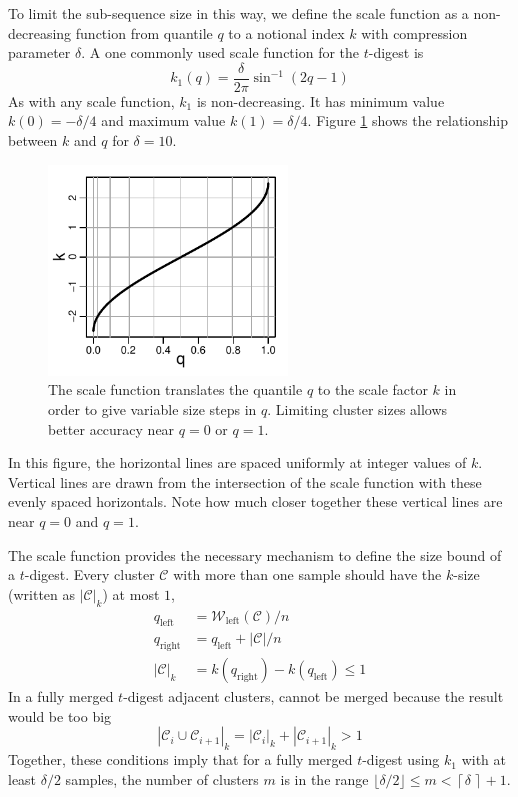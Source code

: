 \documentclass[11pt]{amsart}
\begin{document}
To limit the sub-sequence size in this way, we define the scale function as a non-decreasing function from quantile $q$ to a notional index $k$ with compression parameter $\delta$. A one commonly used  scale function for the $t$-digest is 
\[
k_1(q) = \frac \delta {2\pi}  { {\sin^{-1} (2q-1)} }    
\]
As with any scale function, $k_1$ is non-decreasing. It has minimum value  $k(0)=-\delta/4$ and maximum value  $k(1)=\delta/4$.  Figure \ref{fig:k-q-plot} shows the relationship between $k$ and $q$ for $\delta=10$. 
\begin{figure}[htbp] %
   \centering
   \includegraphics[width=2.5in]{k-q-plot.pdf} 
   \caption{The scale function translates the quantile $q$ to the scale factor $k$ in order to give variable size steps in $q$. Limiting cluster sizes allows better accuracy near $q=0$ or $q=1$. }
   \label{fig:k-q-plot}
\end{figure}
In this figure, the horizontal lines are spaced uniformly at integer values of $k$. Vertical lines are drawn from the intersection of the scale function with these evenly spaced horizontals. Note how much closer together these vertical lines are near $q=0$ and $q=1$.

The scale function provides the necessary mechanism to define the size bound of a $t$-digest. Every cluster $\mathcal C$ with more than one sample should have the $k$-size (written as $|\mathcal C|_k$) at most $1$,
\begin{align*}
q_{\mathrm {left}} &= {\mathcal W}_{\mathrm{left}}(\mathcal C)/n \\
q_{\mathrm {right}} &= q_{\mathrm {left}} + {| \mathcal C | / n}  \\
|\mathcal C|_k &= k \left (q_{\mathrm {right}} \right) - k \left ( q_{\mathrm {left}} \right) \le 1
\end{align*}
In a fully merged $t$-digest adjacent clusters, cannot be merged because the result would be too big 
\[
|\mathcal C_i \cup \mathcal C_{i+1} |_k = |\mathcal C_i|_k + |\mathcal C_{i+1}|_k > 1
\]
Together, these conditions imply that for a fully merged $t$-digest using $k_1$ with at least $\delta/2$ samples, the number of clusters $m$ is in the range $ \lfloor\delta/2\rfloor \le m < \left \lceil\delta \,\right \rceil + 1$. 
\end{document}
